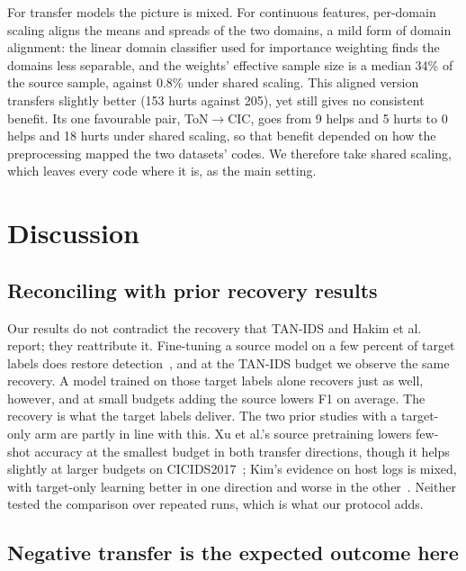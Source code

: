 \documentclass[11pt]{article}
\begin{document}
For transfer models the picture is mixed. For continuous features, per-domain scaling aligns the means and spreads of the two domains, a mild form of domain alignment: the linear domain classifier used for importance weighting finds the domains less separable, and the weights' effective sample size is a median 34\% of the source sample, against 0.8\% under shared scaling. This aligned version transfers slightly better (153 hurts against 205), yet still gives no consistent benefit. Its one favourable pair, ToN$\to$CIC, goes from 9 helps and 5 hurts to 0 helps and 18 hurts under shared scaling, so that benefit depended on how the preprocessing mapped the two datasets' codes. We therefore take shared scaling, which leaves every code where it is, as the main setting.

\section{Discussion}

\subsection{Reconciling with prior recovery results}

Our results do not contradict the recovery that TAN-IDS and Hakim et al. report; they reattribute it. Fine-tuning a source model on a few percent of target labels does restore detection~\cite{hathanh2026tanids}, and at the TAN-IDS budget we observe the same recovery. A model trained on those target labels alone recovers just as well, however, and at small budgets adding the source lowers F1 on average. The recovery is what the target labels deliver. The two prior studies with a target-only arm are partly in line with this. Xu et al.'s source pretraining lowers few-shot accuracy at the smallest budget in both transfer directions, though it helps slightly at larger budgets on CICIDS2017~\cite{xu2025multimodal}; Kim's evidence on host logs is mixed, with target-only learning better in one direction and worse in the other~\cite{kim2026prototype}. Neither tested the comparison over repeated runs, which is what our protocol adds.

\subsection{Negative transfer is the expected outcome here}
\end{document}
